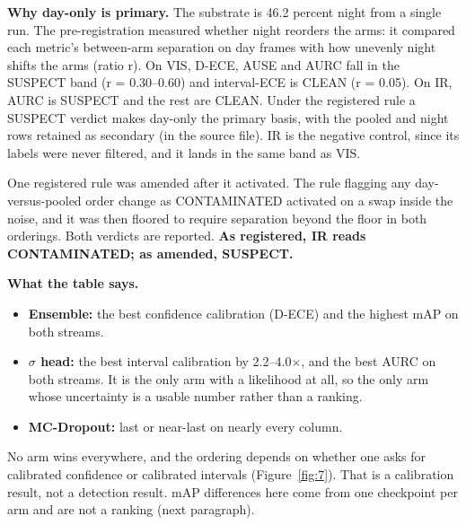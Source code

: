 \documentclass[10pt]{article}
\begin{document}
\textbf{Why day-only is primary.} The substrate is 46.2 percent night from a single run. The pre-registration measured whether night reorders the arms: it compared each metric's between-arm separation on day frames with how unevenly night shifts the arms (ratio r). On VIS, D-ECE, AUSE and AURC fall in the SUSPECT band (r = 0.30--0.60) and interval-ECE is CLEAN (r = 0.05). On IR, AURC is SUSPECT and the rest are CLEAN. Under the registered rule a SUSPECT verdict makes day-only the primary basis, with the pooled and night rows retained as secondary (in the source file). IR is the negative control, since its labels were never filtered, and it lands in the same band as VIS.

One registered rule was amended after it activated. The rule flagging any day-versus-pooled order change as CONTAMINATED activated on a swap inside the noise, and it was then floored to require separation beyond the floor in both orderings. Both verdicts are reported. \textbf{As registered, IR reads CONTAMINATED; as amended, SUSPECT.}

\textbf{What the table says.}
\begin{itemize}
\item \textbf{Ensemble:} the best confidence calibration (D-ECE) and the highest mAP on both streams.
\item \textbf{$\sigma$ head:} the best interval calibration by 2.2--4.0$\times$, and the best AURC on both streams. It is the only arm with a likelihood at all, so the only arm whose uncertainty is a usable number rather than a ranking.
\item \textbf{MC-Dropout:} last or near-last on nearly every column.
\end{itemize}

No arm wins everywhere, and the ordering depends on whether one asks for calibrated confidence or calibrated intervals (Figure~\ref{fig:7}). That is a calibration result, not a detection result. mAP differences here come from one checkpoint per arm and are not a ranking (next paragraph).
\end{document}
